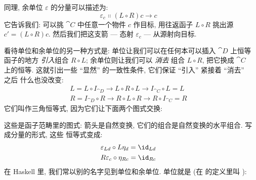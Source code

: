 \noindent
同理, 余单位 $\varepsilon$ 的分量可以描述为:
\[\varepsilon_{c} \Colon (L \circ R) c \to c\]
它告诉我们: 可以挑 $\cat{C}$ 中任意一个物件 $c$ 作目标, 用往返函子 $L \circ R$ 挑出源
$c' = (L \circ R) c$. 然后我们把这支箭 --- 态射 $\varepsilon_{c}$ --- 从源射向目标.

看待单位和余单位的另一种方式是: 单位让我们可以在任何本可以插入 $\cat{D}$ 上恒等函子的地方
\emph{引入}组合 $R \circ L$; 余单位则让我们可以 \emph{消去} 组合 $L \circ R$, 把它换成
$\cat{C}$ 上的恒等. 这就引出一些 ``显然'' 的一致性条件, 它们保证 ``引入'' 紧接着 ``消去'' 之后
什么也没改变:
\begin{gather*}
  L = L \circ I_{\cat{D}} \to L \circ R \circ L \to I_{\cat{C}} \circ L = L \\
  R = I_{\cat{D}} \circ R \to R \circ L \circ R \to R \circ I_{\cat{C}} = R
\end{gather*}
它们叫作三角恒等式, 因为它们让下面两个图式交换:

\begin{figure}[H]
  \centering

  \begin{subfigure}
    \centering
  \end{subfigure}%
  \hspace{1cm}
  \begin{subfigure}
    \centering
  \end{subfigure}
\end{figure}

\noindent
这些是函子范畴里的图式: 箭头是自然变换, 它们的组合是自然变换的水平组合. 写成分量的形式, 这些
恒等式变成:
\begin{gather*}
  \varepsilon_{L d} \circ L \eta_d = \id_{L d} \\
  R \varepsilon_{c} \circ \eta_{R c} = \id_{R c}
\end{gather*}
在 Haskell 里, 我们常以别的名字见到单位和余单位. 单位就是  (在 
的定义里叫 ):


